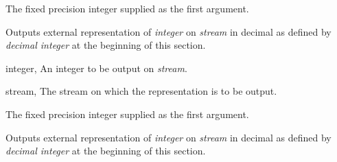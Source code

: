 \begin{optDefinition}
\result%
The fixed precision integer supplied as the first argument.

\remarks%
Outputs external representation of {\em integer\/} on {\em stream\/}
in decimal as defined by {\em decimal integer} at the beginning of
this section.

\begin{specargs}
\item[integer, \classref{fixed-precision-integer}] An integer to be output on {\em stream}.
\item[stream, \classref{stream}] The stream on which the representation is
to be output.
\end{specargs}

\result%
The fixed precision integer supplied as the first argument.

\remarks%
Outputs external representation of {\em integer\/} on {\em stream\/}
in decimal as defined by {\em decimal integer} at the beginning of
this section.

\end{optDefinition}
